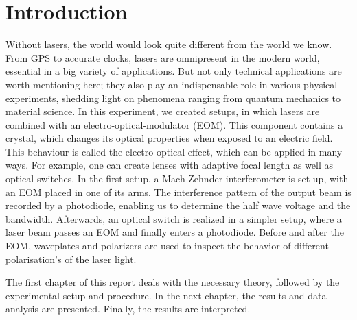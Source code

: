 \section{Introduction}

Without lasers, the world would look quite different from the world we know. From GPS to accurate clocks, lasers are omnipresent in the modern world, essential in a big variety of applications. 
But not only technical applications are worth mentioning here; they also play an indispensable
role in various physical experiments, shedding light on phenomena ranging from quantum mechanics to material science. In this experiment, we created setups, in which lasers are combined with an electro-optical-modulator (EOM). This component contains a crystal, which changes its optical properties when exposed to an electric field. This behaviour is called the electro-optical effect, which can be applied in many ways. For example, one can create lenses with adaptive focal length as well as optical switches. In the first setup, a Mach-Zehnder-interferometer is set up, with an EOM placed in one of its arms. The interference pattern of the output beam is recorded by a photodiode, enabling us to determine the half wave voltage and the bandwidth. Afterwards, an optical switch is realized in a simpler setup, where a laser beam passes an EOM and finally enters a photodiode. Before and after the EOM, waveplates and polarizers are used to inspect the behavior of different polarisation's of the laser light. 

The first chapter of this report deals with the necessary theory, followed by the experimental setup and procedure. In the next chapter, the results and data analysis are presented. Finally, the results are interpreted. 